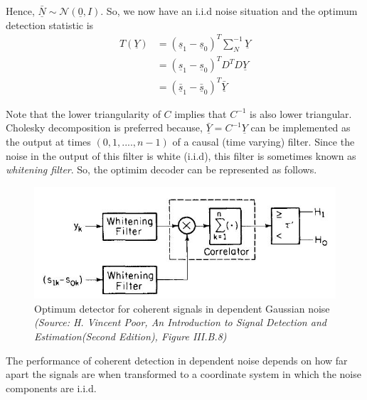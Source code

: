 \documentclass[a4paper,english,12pt]{article}
\begin{document}
\noindent Hence, $\underline{\bar{N}} \sim \mathcal{N}(\underline{0},I)$. So, we now have an i.i.d noise situation and the optimum detection statistic is 
\begin{align*}
T(\underline{Y}) &=(\underline{s}_1 - \underline{s}_0)^T\sum\nolimits_N^{-1}\underline{Y} \\
&=(\underline{s}_1 - \underline{s}_0)^T D^T D \underline{Y} \\
&=(\underline{\bar{s}}_1 - \underline{\bar{s}}_0)^T \underline{\bar{Y}}
\end{align*}

\noindent Note that the lower triangularity of $C$ implies that $C^{-1}$ is also lower triangular.\\
Cholesky decomposition is preferred because, $\underline{\bar{Y}}=C^{-1}\underline{Y}$ can be implemented as the output at times $(0,1,....,n-1)$ of a causal (time varying) filter. Since the noise in the output of this filter is white (i.i.d), this filter is sometimes known as \textit{whitening filter}. So, the optimim decoder can be represented as follows.  

\begin{figure}[hbtp]
\centering
\includegraphics[scale=0.75]{Figures/VP_III_B_8.jpeg}
\caption{Optimum detector for coherent signals in dependent Gaussian noise \\ \textit{(Source: H. Vincent Poor, An Introduction to Signal Detection and Estimation(Second
Edition), Figure III.B.8)}}
\label{vp_III_B_8}
\end{figure}

\noindent The performance of coherent detection in dependent noise depends on how far apart the signals are when transformed to a coordinate system in which the noise components are i.i.d.
\end{document}
